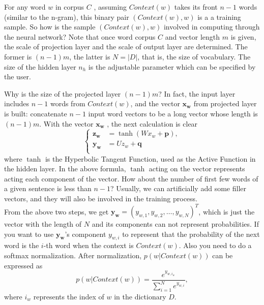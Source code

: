For any word $w$ in corpus $C$ , assuming $Context(w)$ takes its front $n-1$ words (similar to the n-gram), this binary pair $(Context (w), w)$ is a a training sample. So how is the sample $(Context (w), w)$ involved in computing through the neural network? Note that once word corpus $C$ and vector length $m$ is given, the scale of projection layer and the scale of output layer are determined. The former is $(n-1)m$, the latter is $N=|D|$, that is, the size of vocabulary. The size of the hidden layer $n_h$ is the adjustable parameter which can be specified by the user.

Why is the size of the projected layer $(n-1)m$? In fact, the input layer includes $n-1$ words from $Context(w)$, and the vector $\mathbf{x_w}$ from projected layer is built: concatenate $n-1$ input word vectors to be a long vector whose length is $(n-1)m$. With the vector $\mathbf{x_w}$ , the next calculation is clear
\begin{equation}\label{eq:neural4}
\left\{
\begin{aligned}
\mathbf{z_w} & =  \tanh(W x_w+\mathbf{p}),\\
\mathbf{y_w} & =  U z_w + \mathbf{q}\\
\end{aligned}
\right.
\end{equation}
where $\tanh$ is the Hyperbolic Tangent Function, used as the Active Function in the hidden layer. In the above formula, $\tanh$ acting on the vector represents acting each component of the vector. How about the number of first few words of a given sentence is less than $n-1$? Usually, we can artificially add some filler vectors, and they will also be involved in the training process.\\

From the above two steps, we get $\mathbf{y_w}=(y_{w,1},y_{w,2},\ldots,y_{w,N})^T$, which is just the vector with the length of $N$ and its components can not represent probabilities. If you want to use $\mathbf{y_w}$'s component $y_ {w,i}$ to represent that the probability of the next word is the $i$-th word when the context is $Context(w)$. Also you need to do a softmax normalization. After normalization, $p(w|Context(w))$ can be expressed as
\begin{equation}\label{eq:softmax}
p(w|Context(w))=\frac{e^{y_{w,i_w}}}{\sum^N_{i=1}e^{y_{w,i}}},
\end{equation}
where $i_w$ represents the index of $w$ in the dictionary $D$.

